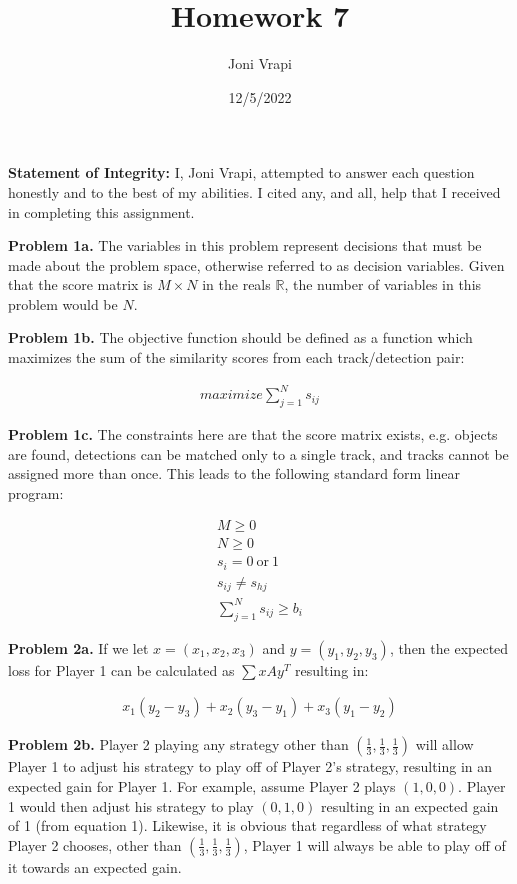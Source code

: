 \documentclass{article}
\title{Homework 7}
\author{Joni Vrapi}
\date{12/5/2022}
\begin{document}
\maketitle

\textbf{Statement of Integrity:} I, Joni Vrapi, attempted to answer each question honestly and to the best of my abilities. I cited any, and all, help that I received in completing this assignment.

\hfill

\textbf{Problem 1a.} The variables in this problem represent decisions that must be made about the problem space, otherwise referred to as decision variables. Given that the score matrix is $M \times N$ in the reals $\mathbb{R}$, the number of variables in this problem would be $N$.

\hfill

\textbf{Problem 1b.} The objective function should be defined as a function which maximizes the sum of the similarity scores from each track/detection pair:

\begin{gather}
    maximize \sum_{j=1}^N s_{ij}
\end{gather}

\hfill

\textbf{Problem 1c.} The constraints here are that the score matrix exists, e.g. objects are found, detections can be matched only to a single track, and tracks cannot be assigned more than once. This leads to the following standard form linear program:

\begin{gather}
    M \geq 0 \\
    N \geq 0 \\
    s_i = 0\ \text{or}\ 1 \\
    s_{ij} \neq s_{hj} \\
    \sum_{j=1}^N s_{ij} \geq b_i
\end{gather}

\hfill

\textbf{Problem 2a.} If we let $x = (x_1, x_2, x_3)$ and $y = (y_1, y_2, y_3)$, then the expected loss for Player 1 can be calculated as $\sum{xAy^T}$ resulting in:

\begin{gather}
    x_1(y_2-y_3) + x_2(y_3-y_1) + x_3(y_1-y_2)
\end{gather}

\hfill

\textbf{Problem 2b.} Player 2 playing any strategy other than $(\frac{1}{3}, \frac{1}{3}, \frac{1}{3})$ will allow Player 1 to adjust his strategy to play off of Player 2's strategy, resulting in an expected gain for Player 1. For example, assume Player 2 plays $(1, 0, 0)$. Player 1 would then adjust his strategy to play $(0, 1, 0)$ resulting in an expected gain of 1 (from equation 1). Likewise, it is obvious that regardless of what strategy Player 2 chooses, other than $(\frac{1}{3}, \frac{1}{3}, \frac{1}{3})$, Player 1 will always be able to play off of it towards an expected gain.
\end{document}

